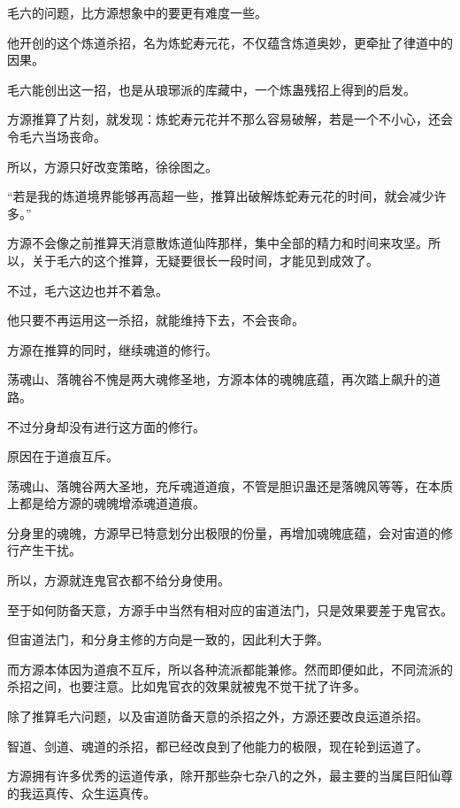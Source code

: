 
\begin{this_body}

毛六的问题，比方源想象中的要更有难度一些。

他开创的这个炼道杀招，名为炼蛇寿元花，不仅蕴含炼道奥妙，更牵扯了律道中的因果。

毛六能创出这一招，也是从琅琊派的库藏中，一个炼蛊残招上得到的启发。

方源推算了片刻，就发现：炼蛇寿元花并不那么容易破解，若是一个不小心，还会令毛六当场丧命。

所以，方源只好改变策略，徐徐图之。

“若是我的炼道境界能够再高超一些，推算出破解炼蛇寿元花的时间，就会减少许多。”

方源不会像之前推算天消意散炼道仙阵那样，集中全部的精力和时间来攻坚。所以，关于毛六的这个推算，无疑要很长一段时间，才能见到成效了。

不过，毛六这边也并不着急。

他只要不再运用这一杀招，就能维持下去，不会丧命。

方源在推算的同时，继续魂道的修行。

荡魂山、落魄谷不愧是两大魂修圣地，方源本体的魂魄底蕴，再次踏上飙升的道路。

不过分身却没有进行这方面的修行。

原因在于道痕互斥。

荡魂山、落魄谷两大圣地，充斥魂道道痕，不管是胆识蛊还是落魄风等等，在本质上都是给方源的魂魄增添魂道道痕。

分身里的魂魄，方源早已特意划分出极限的份量，再增加魂魄底蕴，会对宙道的修行产生干扰。

所以，方源就连鬼官衣都不给分身使用。

至于如何防备天意，方源手中当然有相对应的宙道法门，只是效果要差于鬼官衣。

但宙道法门，和分身主修的方向是一致的，因此利大于弊。

而方源本体因为道痕不互斥，所以各种流派都能兼修。然而即便如此，不同流派的杀招之间，也要注意。比如鬼官衣的效果就被鬼不觉干扰了许多。

除了推算毛六问题，以及宙道防备天意的杀招之外，方源还要改良运道杀招。

智道、剑道、魂道的杀招，都已经改良到了他能力的极限，现在轮到运道了。

方源拥有许多优秀的运道传承，除开那些杂七杂八的之外，最主要的当属巨阳仙尊的我运真传、众生运真传。


\end{this_body}
